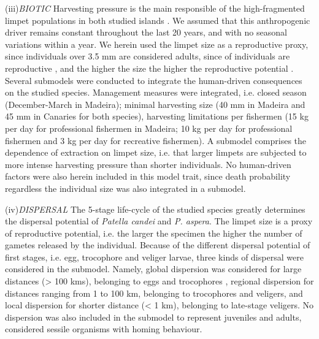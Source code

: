 \documentclass[12pt]{article}
\begin{document}
\begin{flushleft}
{{{{{(iii)\textit{BIOTIC}
Harvesting pressure is the main responsible of the high-fragmented limpet populations in both studied islands \citep{riera2016clear,sousa2019long}. We assumed that this anthropogenic driver remains constant throughout the last 20 years, and with no seasonal variations within a year. We herein used the limpet size as a reproductive proxy, since individuals over 3.5 mm are considered adults, since  of individuals are reproductive \citep{henriques2012life}, and the higher the size the higher the reproductive potential \citep{boaventura2002analysis, martins2017exploitation}. Several submodels were conducted to integrate the human-driven consequences on the studied species. Management measures were integrated, i.e. closed season (December-March in Madeira); minimal harvesting size (40 mm in Madeira and 45 mm in Canaries for both species), harvesting limitations per fishermen (15 kg per day for professional fishermen in Madeira; 10 kg per day for professional fishermen and 3 kg per day for recreative fishermen). A submodel comprises the dependence of extraction on limpet size, i.e. that larger limpets are subjected to more intense harvesting pressure than shorter individuals.
No human-driven factors were also herein included in this model trait, since death probability regardless the individual size was also integrated in a submodel.

(iv)\textit{DISPERSAL}
The 5-stage life-cycle of the studied species greatly determines the dispersal potential of \textit{Patella candei} and \textit{P. aspera}. The limpet size is a proxy of reproductive potential, i.e. the larger the specimen the higher the number of gametes released by the individual. Because of the different dispersal potential of first stages, i.e. egg, trocophore and veliger larvae, three kinds of dispersal were considered in the submodel. Namely, global dispersion was considered for large distances (> 100 kms), belonging to eggs and trocophores , regional dispersion for distances ranging from 1 to 100 km, belonging to trocophores and veligers, and local dispersion for shorter distance (< 1 km), belonging to late-stage veligers. No dispersion was also included in the submodel to represent juveniles and adults, considered sessile organisms with homing behaviour.

}}}}}
\end{flushleft}
\end{document}
